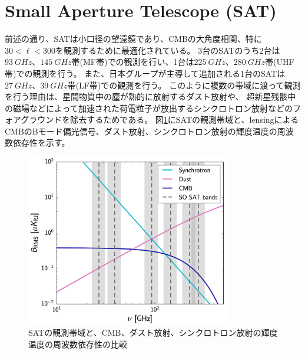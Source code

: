\documentclass[../../main.tex]{subfiles}
\begin{document}
\section{Small Aperture Telescope (SAT)}
前述の通り、SATは小口径の望遠鏡であり、CMBの大角度相関、特に$30<\ell<300$を観測するために最適化されている。
3台のSATのうち2台は$\SI{93}{GHz}$、$\SI{145}{GHz}$帯(MF帯)での観測を行い、1台は$\SI{225}{GHz}$、$\SI{280}{GHz}$帯(UHF帯)での観測を行う。
また、日本グループが主導して追加される1台のSATは$\SI{27}{GHz}$、$\SI{39}{GHz}$帯(LF帯)での観測を行う。
このように複数の帯域に渡って観測を行う理由は、星間物質中の塵が熱的に放射するダスト放射や、
超新星残骸中の磁場などによって加速された荷電粒子が放出するシンクロトロン放射などのフォアグラウンドを除去するためである。
図\ref{fig:so_noise_freq}にSATの観測帯域と、lensingによるCMBのBモード偏光信号、ダスト放射、シンクロトロン放射の輝度温度の周波数依存性を示す。
\begin{figure}[H]
    \centering
    \includegraphics[width=0.8\textwidth]{simons_observatory/so_noise_freq.pdf}
    \caption{SATの観測帯域と、CMB、ダスト放射、シンクロトロン放射の輝度温度の周波数依存性の比較}
    \label{fig:so_noise_freq}
\end{figure}
\end{document}

